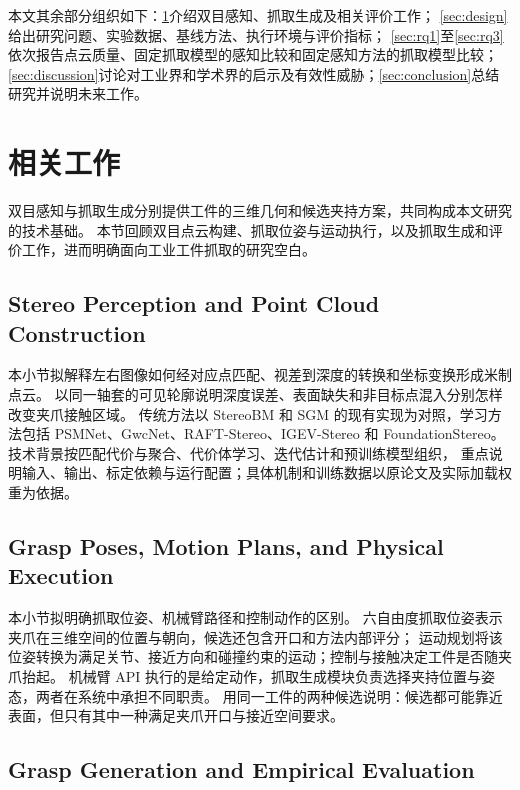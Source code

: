 \documentclass[UTF8,fontset=fandol,a4paper,11pt]{ctexart}
\newcommand{\qyb}[1]{\textcolor{red!75!black}{#1}}
\begin{document}
本文其余部分组织如下：\cref{sec:background}介绍双目感知、抓取生成及相关评价工作；
\cref{sec:design}给出研究问题、实验数据、基线方法、执行环境与评价指标；
\cref{sec:rq1}至\cref{sec:rq3}依次报告点云质量、固定抓取模型的感知比较和固定感知方法的抓取模型比较；
\cref{sec:discussion}讨论对工业界和学术界的启示及有效性威胁；\cref{sec:conclusion}总结研究并说明未来工作。

\section{\qyb{相关工作}}
\label{sec:background}

双目感知与抓取生成分别提供工件的三维几何和候选夹持方案，共同构成本文研究的技术基础。
本节回顾双目点云构建、抓取位姿与运动执行，以及抓取生成和评价工作，进而明确面向工业工件抓取的研究空白。

\subsection{\qyb{Stereo Perception and Point Cloud Construction}}

本小节拟解释左右图像如何经对应点匹配、视差到深度的转换和坐标变换形成米制点云。
以同一轴套的可见轮廓说明深度误差、表面缺失和非目标点混入分别怎样改变夹爪接触区域。
传统方法以 StereoBM 和 SGM 的现有实现为对照，学习方法包括 PSMNet、GwcNet、RAFT-Stereo、IGEV-Stereo 和 FoundationStereo。
技术背景按匹配代价与聚合、代价体学习、迭代估计和预训练模型组织，
重点说明输入、输出、标定依赖与运行配置；具体机制和训练数据以原论文及实际加载权重为依据。

\subsection{\qyb{Grasp Poses, Motion Plans, and Physical Execution}}

本小节拟明确抓取位姿、机械臂路径和控制动作的区别。
六自由度抓取位姿表示夹爪在三维空间的位置与朝向，候选还包含开口和方法内部评分；
运动规划将该位姿转换为满足关节、接近方向和碰撞约束的运动；控制与接触决定工件是否随夹爪抬起。
机械臂 API 执行的是给定动作，抓取生成模块负责选择夹持位置与姿态，两者在系统中承担不同职责。
用同一工件的两种候选说明：候选都可能靠近表面，但只有其中一种满足夹爪开口与接近空间要求。

\subsection{\qyb{Grasp Generation and Empirical Evaluation}}
\end{document}
